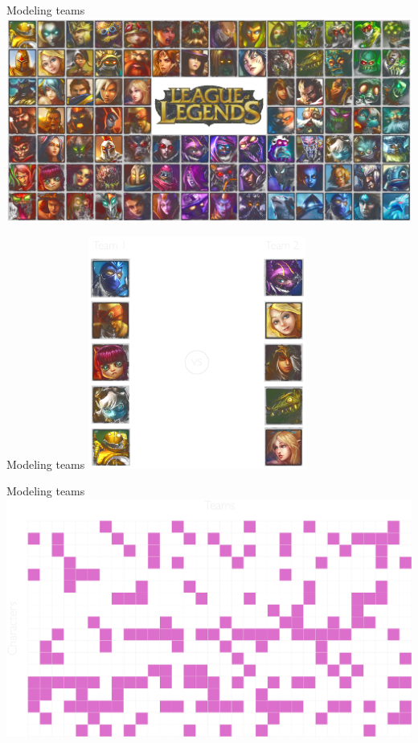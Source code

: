 \documentclass[mathserif]{beamer}
\begin{document}
\begin{frame}{Modeling teams}
\includegraphics[width=\textwidth]{figures/champions_transparent.png}\\
\end{frame}

\begin{frame}{Modeling teams}
\centering
\includegraphics[height=3in]{figures/champions5v5.pdf}
\end{frame}

\begin{frame}{Modeling teams}
\centering
\includegraphics[width=\textwidth]{figures/grid_hots.pdf}
\end{frame}
\end{document}

